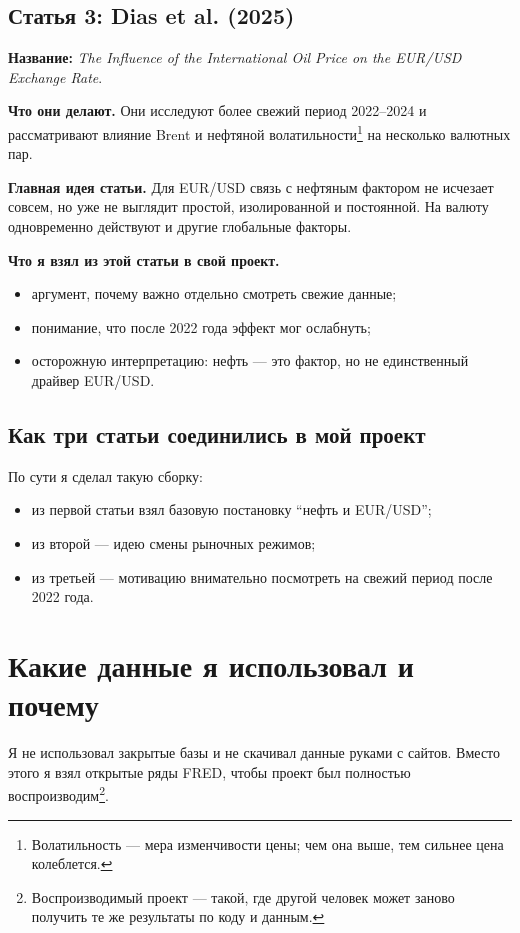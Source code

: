 \documentclass[a4paper,12pt]{article}
\begin{document}
\subsection{Статья 3: Dias et al. (2025)}
\textbf{Название:} \textit{The Influence of the International Oil Price on the EUR/USD Exchange Rate}.

\textbf{Что они делают.}
Они исследуют более свежий период 2022--2024 и рассматривают влияние Brent и нефтяной волатильности\footnote{Волатильность --- мера изменчивости цены; чем она выше, тем сильнее цена колеблется.} на несколько валютных пар.

\textbf{Главная идея статьи.}
Для EUR/USD связь с нефтяным фактором не исчезает совсем, но уже не выглядит простой, изолированной и постоянной. На валюту одновременно действуют и другие глобальные факторы.

\textbf{Что я взял из этой статьи в свой проект.}
\begin{itemize}
    \item аргумент, почему важно отдельно смотреть свежие данные;
    \item понимание, что после 2022 года эффект мог ослабнуть;
    \item осторожную интерпретацию: нефть --- это фактор, но не единственный драйвер EUR/USD.
\end{itemize}

\subsection{Как три статьи соединились в мой проект}
По сути я сделал такую сборку:
\begin{itemize}
    \item из первой статьи взял базовую постановку ``нефть и EUR/USD'';
    \item из второй --- идею смены рыночных режимов;
    \item из третьей --- мотивацию внимательно посмотреть на свежий период после 2022 года.
\end{itemize}

\section{Какие данные я использовал и почему}
Я не использовал закрытые базы и не скачивал данные руками с сайтов. Вместо этого я взял открытые ряды FRED, чтобы проект был полностью воспроизводим\footnote{Воспроизводимый проект --- такой, где другой человек может заново получить те же результаты по коду и данным.}.
\end{document}
